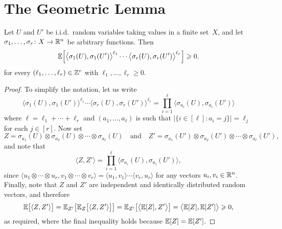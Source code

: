 
\section{The Geometric Lemma}


\begin{lemma}
  \label{lem:moments} %
  \uses{}
  Let \(U\) and \(U'\) be i.i.d.~random variables taking values in a finite set~\(X\), and let \(\sigma_1,\ldots,\sigma_r \colon X \rightarrow \mathbb{R}^n\) be arbitrary functions. Then
  \begin{equation*}
    \mathbb{E}\Big[ \big\langle \sigma_1(U),\sigma_1(U') \big\rangle^{\ell_1} \cdots \big\langle \sigma_r(U),\sigma_r(U') \big\rangle^{\ell_r} \Big] \geqslant 0.
  \end{equation*}
  for every \((\ell_1,\dots,\ell_r) \in \mathbb{Z}^r\) with \(\ell_1,\dots,\ell_r \ge 0\).
\end{lemma}
%
\begin{proof}
  To simplify the notation, let us write
	\begin{equation*}
		\big\langle \sigma_1(U),\sigma_1(U') \big\rangle^{\ell_1} \cdots \big\langle \sigma_r(U), \sigma_r(U') \big\rangle^{\ell_r} = \prod_{i = 1}^\ell \big\langle \sigma_{a_i}(U), \sigma_{a_i}(U') \big\rangle
	\end{equation*}
	where \(\ell = \ell_1 + \cdots + \ell_r\) and \((a_1,\dots,a_\ell)\) is such that \(\big| \big\{ i \in [\ell] : a_i = j \big\} \big| = \ell_j\) for each \(j \in [r]\). Now set
	\begin{equation*}
		Z = \sigma_{a_1}(U) \otimes \sigma_{a_2}(U) \otimes \cdots \otimes \sigma_{a_\ell}(U) \quad \text{and} \quad Z' = \sigma_{a_1}(U') \otimes \sigma_{a_2}(U') \otimes \cdots \otimes \sigma_{a_\ell}(U'),
	\end{equation*}
	and note that
	\begin{equation*}
		\big\langle Z, Z' \big\rangle = \prod_{i = 1}^\ell \big\langle \sigma_{a_i}(U), \sigma_{a_i}(U') \big\rangle,
	\end{equation*}
	since \(\langle u_1 \otimes \cdots \otimes u_r, v_1 \otimes \cdots \otimes v_r \rangle = \langle u_1, v_1 \rangle  \cdots \langle v_r , u_r \rangle \) for any vectors \(u_i,v_i \in \mathbb{R}^n\). Finally, note that \(Z\) and \(Z'\) are independent and identically distributed random vectors, and therefore
	\begin{equation*}
		\mathbb{E} \big[ \langle Z, Z' \rangle \big] = \mathbb{E}_{Z'} \big[ \mathbb{E}_Z \big[ \langle Z, Z' \rangle \big] \big] =
		\mathbb{E}_{Z'} \big[ \big\langle \mathbb{E}[Z], Z' \big\rangle \big] = \big\langle \mathbb{E}[Z], \mathbb{E}[Z'] \big\rangle \geqslant 0,
	\end{equation*}
	as required, where the final inequality holds because \(\mathbb{E}[Z] = \mathbb{E}[Z']\).
\end{proof}

